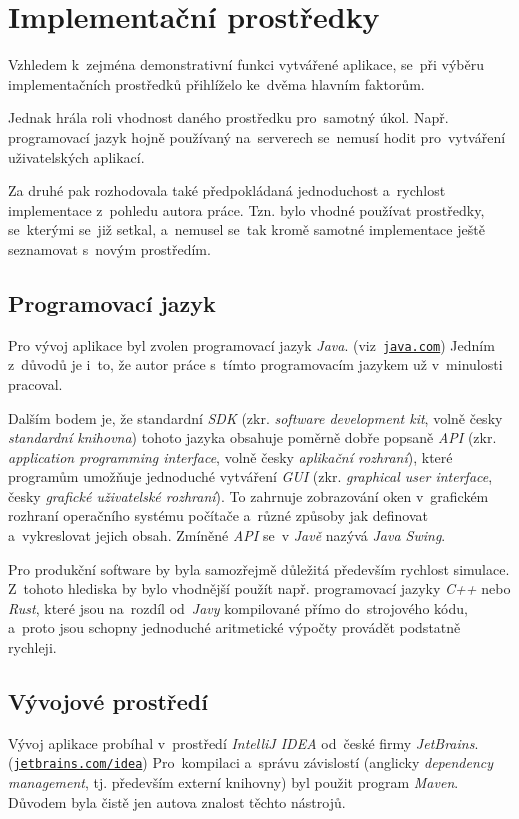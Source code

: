 \section{Implementační prostředky}

Vzhledem k~zejména demonstrativní funkci vytvářené aplikace, se~při výběru implementačních prostředků přihlíželo ke~dvěma hlavním faktorům.

Jednak hrála roli vhodnost daného prostředku pro~samotný úkol. Např. programovací jazyk hojně používaný na~serverech se~nemusí hodit pro~vytváření uživatelských aplikací.

Za druhé pak rozhodovala také předpokládaná jednoduchost a~rychlost implementace z~pohledu autora práce. Tzn. bylo vhodné používat prostředky, se~kterými se~již setkal, a~nemusel se~tak kromě samotné implementace ještě seznamovat s~novým prostředím.

\subsection{Programovací jazyk}

\begin{sloppypar}
Pro vývoj aplikace byl zvolen programovací jazyk \emph{Java}. (viz~\texttt{\href{http://www.java.com/}{java.com}}) Jedním z~důvodů je i~to, že autor práce s~tímto programovacím jazykem už v~minulosti pracoval.
\end{sloppypar}

Dalším bodem je, že standardní \emph{SDK} (zkr. \emph{software development kit}, volně česky \emph{standardní knihovna}) tohoto jazyka obsahuje poměrně dobře popsaně \emph{API} (zkr. \emph{application programming interface}, volně česky \emph{aplikační rozhraní}), které programům umožňuje jednoduché vytváření \emph{GUI} (zkr. \emph{graphical user interface}, česky \emph{grafické uživatelské rozhraní}). To zahrnuje zobrazování oken v~grafickém rozhraní operačního systému počítače a~rů\-zné způsoby jak definovat a~vykreslovat jejich obsah. Zmíněné \emph{API} se~v \emph{Javě} nazývá \emph{Java Swing}.

Pro produkční software by byla samozřejmě důležitá především rychlost simulace. Z~tohoto hlediska by bylo vhodnější použít např. programovací jazyky \emph{C++} nebo \emph{Rust}, které jsou na~rozdíl od~\emph{Javy} kompilované přímo do~strojového kódu, a~proto jsou schopny jednoduché aritmetické výpočty provádět podstatně rychleji.

\subsection{Vývojové prostředí}

\begin{sloppypar}
Vývoj aplikace probíhal v~prostředí \emph{IntelliJ IDEA} od~české firmy \emph{JetBrains}. (\texttt{\href{http://www.jetbrains.com/idea/}{jetbrains.com/idea}}) Pro~kompilaci a~správu závislostí (anglicky \emph{dependency management}, tj. především externí knihovny) byl použit program \emph{Maven}. Důvodem byla čistě jen autova znalost těchto nástrojů. 
\end{sloppypar}
